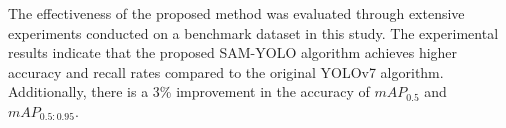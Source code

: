 \documentclass[aic]{iosart2x}
\begin{document}
The effectiveness of the proposed method was evaluated through extensive experiments conducted on a benchmark dataset in this study. The experimental results indicate that the proposed SAM-YOLO algorithm achieves higher accuracy and recall rates compared to the original YOLOv7 algorithm. Additionally, there is a 3\% improvement in the accuracy of $mAP_{0.5}$ and $mAP_{0.5:0.95}$.
\begin{table}[!ht]
    \caption{Comparison of evaluation indicators results}
    \label{tab:evaluation_indicators}
    \centering
\end{table}
\end{document}
